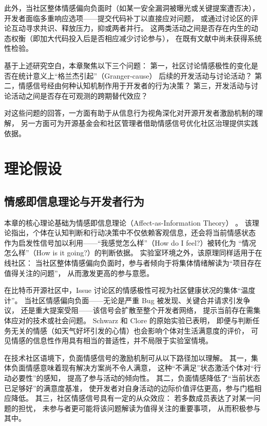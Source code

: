 \documentclass[
    type = master, %
    degree = professional,        %
    decl-page,  %
    twoside,                %
    fontset = fandol %
  ]{njuthesis}
\begin{document}
此外，当社区整体情感偏向负面时（如某一安全漏洞被曝光或关键提案遭否决），
开发者面临多重响应选项——提交代码补丁以直接应对问题，
或通过讨论区的评论互动寻求共识、释放压力，抑或两者并行。
这两类活动之间是否存在内生的动态权衡（即加大代码投入后是否相应减少讨论参与），
在既有文献中尚未获得系统性检验。

基于上述研究空白，本章聚焦以下三个问题：
第一，社区讨论情感极性的变化是否在统计意义上“格兰杰引起”（Granger-cause）
后续的开发活动与讨论活动？
第二，情感信号经由何种认知机制作用于开发者的行为决策？
第三，开发活动与讨论活动之间是否存在可观测的跨期替代效应？

对这些问题的回答，一方面有助于从信息行为视角深化对开源开发者激励机制的理解，
另一方面可为开源基金会和社区管理者借助情感信号优化社区治理提供实践依据。


\section{理论假设}

\subsection{情感即信息理论与开发者行为}

本章的核心理论基础为情感即信息理论（Affect-as-Information Theory）
\cite{schwarz1983moods}。
该理论指出，个体在认知判断和行动决策中不仅依赖客观信息，还会将当前情感状态
作为启发性信号加以利用——“我感觉怎么样”（How do I feel?）被转化为
“情况怎么样”（How is it going?）的判断依据。
实验室环境之外，该原理同样适用于在线社区：
当社区整体情感偏向负面时，参与者倾向于将集体情绪解读为“项目存在值得关注的问题”，
从而激发更高的参与意愿。

在比特币开源社区中，Issue 讨论区的情感极性可视为社区健康状况的集体“温度计”。
当社区情感偏向负面——无论是严重 Bug 被发现、关键合并请求引发争议，
还是重大提案受阻——该信号会扩散至整个开发者网络，
提示当前存在需集体应对的技术或社会问题。
Schwarz 和 Clore \citeyear{schwarz1983moods}的原始实验已表明，
即便与判断任务无关的情感（如天气好坏引发的心情）也会影响个体对生活满意度的评价，
可见情感的信息性作用具有相当的普适性，并不局限于实验室情境。

在技术社区语境下，负面情感信号的激励机制可从以下路径加以理解。
其一，集体负面情感意味着现有解决方案尚不令人满意，
这种“不满足”状态激活个体对“行动必要性”的感知，
提高了参与活动的倾向性。
其二，负面情感降低了“当前状态已足够好”的满意度基准，
使开发者对自身活动的边际价值评估更高，参与门槛相应降低。
其三，社区情感信号具有一定的从众效应：
若多数成员表达了对某一问题的担忧，
未参与者更可能将该问题解读为值得关注的重要事项，
从而积极参与其中\cite{yang2021differential}。
\end{document}
